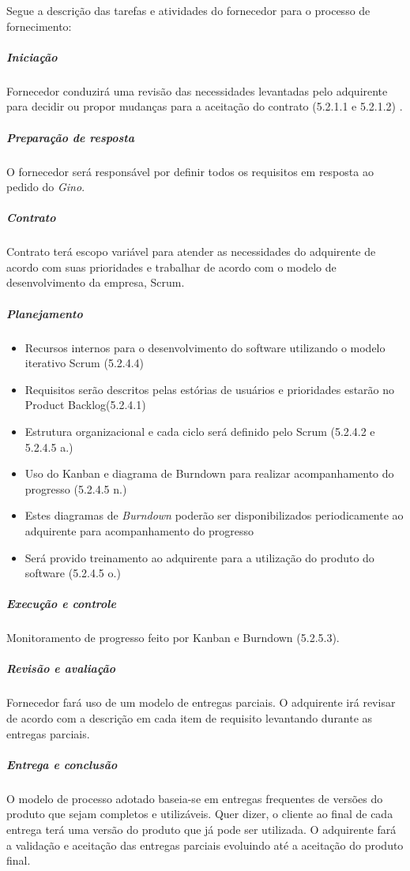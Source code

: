 Segue a descrição das tarefas e atividades do fornecedor para o processo de fornecimento:


\subparagraph{Iniciação}

Fornecedor conduzirá uma revisão das necessidades levantadas pelo adquirente para decidir ou propor mudanças para a aceitação do contrato (5.2.1.1 e 5.2.1.2) \cite{iso12207:95}.

\subparagraph{Preparação de resposta}

O fornecedor será responsável por definir todos os requisitos em resposta ao pedido do \textit{Gino}.

\subparagraph{Contrato}

Contrato terá escopo variável para atender as necessidades do adquirente de acordo com suas prioridades e trabalhar de acordo com o modelo de desenvolvimento da empresa, Scrum.

\subparagraph{Planejamento}

\begin{itemize}
  \item Recursos internos para o desenvolvimento do software utilizando o modelo iterativo Scrum (5.2.4.4)
  \item Requisitos serão descritos pelas estórias de usuários e prioridades estarão no Product Backlog(5.2.4.1)
  \item Estrutura organizacional e cada ciclo será definido pelo Scrum (5.2.4.2 e 5.2.4.5 a.)
  \item Uso do Kanban e diagrama de Burndown para realizar acompanhamento do progresso (5.2.4.5 n.)
  \item Estes diagramas de \textit{Burndown} poderão ser disponibilizados periodicamente ao adquirente para acompanhamento do progresso
  \item Será provido treinamento ao adquirente para a utilização do produto do software (5.2.4.5 o.)
\end{itemize}

\subparagraph{Execução e controle}

Monitoramento de progresso feito por Kanban e Burndown (5.2.5.3).

\subparagraph{Revisão e avaliação}

Fornecedor fará uso de um modelo de entregas parciais. O adquirente irá revisar de acordo com a descrição em cada item de requisito levantando durante as entregas parciais. 

\subparagraph{Entrega e conclusão}

O modelo de processo adotado baseia-se em entregas frequentes de versões do produto que sejam completos e utilizáveis. Quer dizer, o cliente ao final de cada entrega terá uma versão do produto que já pode ser utilizada. O adquirente fará a validação e aceitação das entregas parciais evoluindo até a aceitação do produto final.


